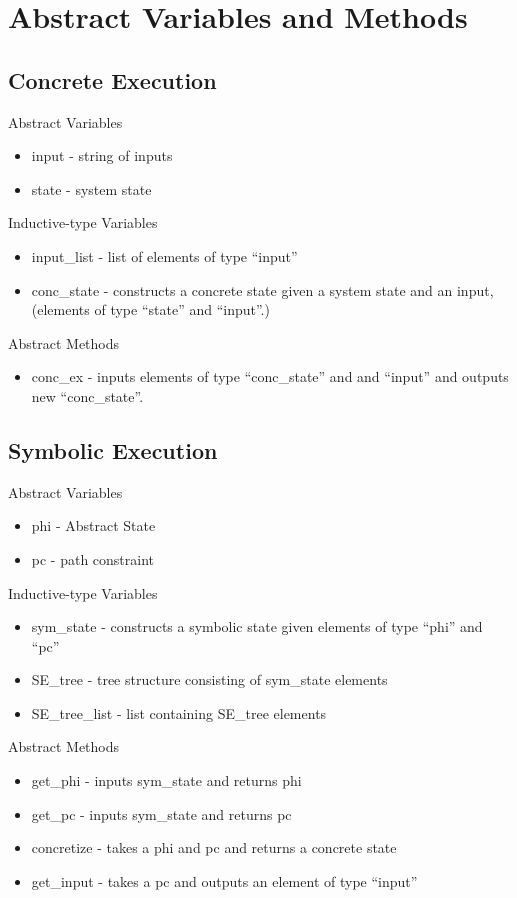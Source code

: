 \section{Abstract Variables and Methods}
\subsection{Concrete Execution}

Abstract Variables
\begin{itemize}
\item input - string of inputs
\item state - system state
\end{itemize}

Inductive-type Variables
\begin{itemize}
\item input\_list - list of elements of type ``input''
\item conc\_state - constructs a concrete state given a system state and an input, (elements of type ``state'' and ``input''.)
\end{itemize}

Abstract Methods
\begin{itemize}
\item conc\_ex - inputs elements of type ``conc\_state'' and and ``input'' and outputs new ``conc\_state''.
\end{itemize}


\subsection{Symbolic Execution}

Abstract Variables
\begin{itemize}
\item phi - Abstract State
\item pc - path constraint
\end{itemize}

Inductive-type Variables
\begin{itemize}
\item sym\_state - constructs a symbolic state given elements of type ``phi'' and ``pc''
\item SE\_tree - tree structure consisting of sym\_state elements
\item SE\_tree\_list - list containing SE\_tree elements
\end{itemize}

Abstract Methods
\begin{itemize}
\item get\_phi - inputs sym\_state and returns phi
\item get\_pc - inputs sym\_state and returns pc
\item concretize - takes a phi and pc and returns a concrete state
\item get\_input - takes a pc and outputs an element of type ``input''
\end{itemize}

